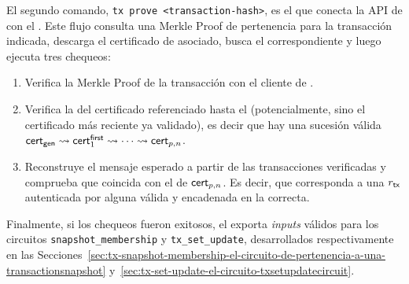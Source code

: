 El segundo comando, \texttt{tx prove <transaction-hash>}, es el que conecta la API de \Mithril con el \zkBridge. Este flujo consulta una Merkle Proof de pertenencia para la transacción indicada, descarga el certificado de \CardanoTransactions asociado, busca el \Snapshot correspondiente y luego ejecuta tres chequeos:

\begin{enumerate}[noitemsep]
	\item Verifica la Merkle Proof de la transacción con el cliente de \Mithril.
	\item Verifica la \CertificateChain del certificado referenciado hasta el \GenesisCertificate (potencialmente, sino el certificado más reciente ya validado), es decir que hay una sucesión válida $\mathsf{cert}_{\mathsf{gen}} \rightsquigarrow \mathsf{cert}^{\mathsf{first}}_1 \rightsquigarrow \cdots \rightsquigarrow \mathsf{cert}_{p,n}$.
	\item Reconstruye el mensaje esperado \ProtocolMsg a partir de las transacciones verificadas y comprueba que coincida con el de $\mathsf{cert}_{p,n}$. Es decir, que corresponda a una $r_\mathsf{tx}$ autenticada por alguna \AVK válida y encadenada en la \CertificateChain correcta.
\end{enumerate}

Finalmente, si los chequeos fueron exitosos, el \ZkBridgeOperator exporta \textit{inputs} válidos para los circuitos \texttt{snapshot\_membership} y \texttt{tx\_set\_update}, desarrollados respectivamente en las Secciones~\ref{sec:tx-snapshot-membership-el-circuito-de-pertenencia-a-una-transactionsnapshot} y~\ref{sec:tx-set-update-el-circuito-txsetupdatecircuit}.
